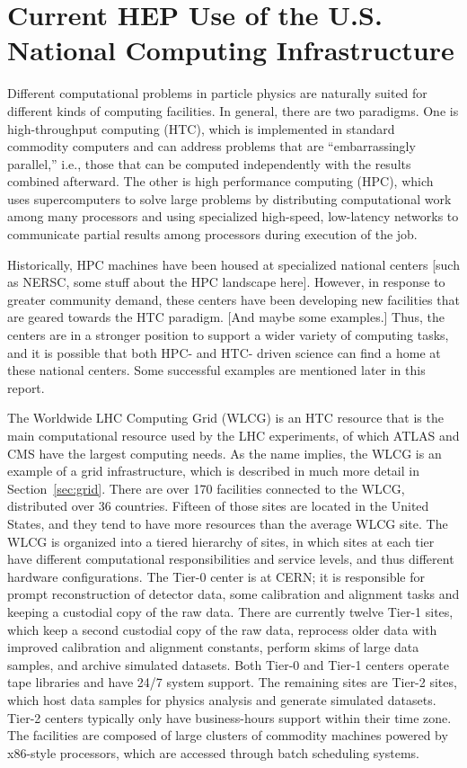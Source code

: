 \section{Current HEP Use of the U.S. National Computing Infrastructure}

Different computational problems in particle physics are naturally suited for different kinds of computing facilities.  In general, there are two paradigms.  One is high-throughput computing (HTC), which is implemented in standard commodity computers and can address problems that are ``embarrassingly parallel,'' i.e., those that can be computed independently with the results combined afterward.  The other is high performance computing (HPC), which uses supercomputers to solve large problems by distributing computational work among many processors and using specialized high-speed, low-latency networks to communicate partial results among processors during execution of the job.

Historically, HPC machines have been housed at specialized national centers [such as NERSC, some stuff about the HPC landscape here].  However, in response to greater community demand, these centers have been developing new facilities that are geared towards the HTC paradigm.  [And maybe some examples.]  Thus, the centers are in a stronger position to support a wider variety of computing tasks, and it is possible that both HPC- and HTC- driven science can find a home at these national centers.  Some successful examples are mentioned later in this report.

The Worldwide LHC Computing Grid (WLCG) is an HTC resource that is the main computational resource used by the LHC experiments, of which ATLAS and CMS have the largest computing needs.  As the name implies, the WLCG is an example of a grid infrastructure, which is described in much more detail in Section~\ref{sec:grid}.  There are over 170 facilities connected to the WLCG, distributed over 36 countries.  Fifteen of those sites are located in the United States, and they tend to have more resources than the average WLCG site.  The WLCG is organized into a tiered hierarchy of sites, in which sites at each tier have different computational responsibilities and service levels, and thus different hardware configurations.  The Tier-0 center is at CERN; it is responsible for prompt reconstruction of detector data, some calibration and alignment tasks and keeping a custodial copy of the raw data.  There are currently twelve Tier-1 sites, which keep a second custodial copy of the raw data, reprocess older data with improved calibration and alignment constants, perform skims of large data samples, and archive simulated datasets.  Both Tier-0 and Tier-1 centers operate tape libraries and have 24/7 system support.  The remaining sites are Tier-2 sites, which host data samples for physics analysis and generate simulated datasets.  Tier-2 centers typically only have business-hours support within their time zone.  The facilities are composed of large clusters of commodity machines powered by x86-style processors, which are accessed through batch scheduling systems.

